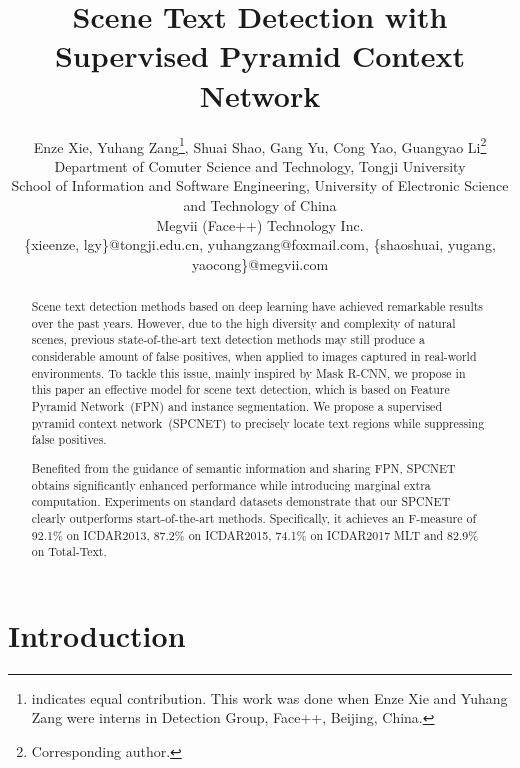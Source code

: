 \documentclass[letterpaper]{article} \usepackage{aaai19}  \usepackage{times}  \usepackage{helvet}  \usepackage{courier}  \usepackage{url}  \usepackage{graphicx}
\begin{document}
\title{Scene Text Detection with Supervised Pyramid Context Network}
\author{
Enze Xie, Yuhang Zang\thanks{ indicates equal contribution. This work was done when Enze Xie and Yuhang Zang were interns in Detection Group, Face++, Beijing, China.}, Shuai Shao, Gang Yu, Cong Yao, Guangyao Li\thanks{ Corresponding author.}\\
Department of Comuter Science and Technology, Tongji University\\
School of Information and Software Engineering,  University of Electronic Science and Technology of China\\
Megvii (Face++) Technology Inc.\\
\{xieenze, lgy\}@tongji.edu.cn, yuhangzang@foxmail.com, \{shaoshuai, yugang, yaocong\}@megvii.com
}


\maketitle


\begin{abstract}
Scene text detection methods based on deep learning have achieved remarkable results over the past years.
However, due to the high diversity and complexity of natural scenes, previous state-of-the-art text detection methods may still produce a considerable amount of false positives, when applied to images captured in real-world environments. To tackle this issue, mainly inspired by Mask R-CNN, we propose in this paper an effective model for scene text detection, which is based on Feature Pyramid Network~(FPN) and instance segmentation. We propose a supervised pyramid context network~(SPCNET) to precisely locate text regions while suppressing false positives.

Benefited from the guidance of semantic information and sharing FPN, SPCNET obtains significantly enhanced performance while introducing marginal extra computation. Experiments on standard datasets demonstrate that our SPCNET clearly outperforms start-of-the-art methods. Specifically, it achieves an F-measure of 92.1\% on ICDAR2013, 87.2\% on ICDAR2015, 74.1\% on ICDAR2017 MLT and 82.9\% on Total-Text.
\end{abstract}

\section{Introduction}
\end{document}
